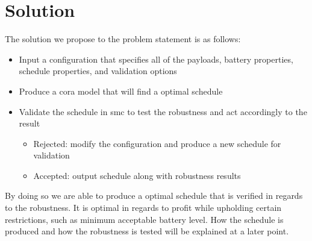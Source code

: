\section{Solution} \label{sec:solution}
The solution we propose to the problem statement is as follows:
\begin{itemize}
	\item	Input a configuration that specifies all of the payloads, battery properties, schedule properties, and validation options
	\item	Produce a \gls{cora} model that will find a optimal schedule
	\item	Validate the schedule in \gls{smc} to test the robustness and act accordingly to the result
	\begin{itemize}
		\item	Rejected: modify the configuration and produce a new schedule for validation
		\item	Accepted: output schedule along with robustness results
	\end{itemize}
\end{itemize}

By doing so we are able to produce a optimal schedule that is verified in regards to the robustness.
It is optimal in regards to profit while upholding certain restrictions, such as minimum acceptable battery level.
How the schedule is produced and how the robustness is tested will be explained at a later point.
